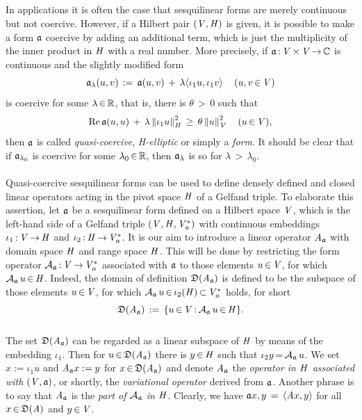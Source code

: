 \documentclass[11pt,twoside]{article}
\begin{document}
\subparagraph{} %
In applications it is often the case
that sesquilinear forms are merely continuous but not coercive.
However,
if a Hilbert pair $(\mathit{V},\mathit{H})$ is given,
it is possible to make a form $\mathfrak{a}$ coercive by adding an additional term,
which is just the multiplicity of the inner product in $\mathit{H}$
with a real number.
More precisely,
if $\mathfrak{a} {\,:\,} \mathit{V} {\,\times\,} \mathit{V} {\,\to\,} {\mathbb{C}}$ is continuous
and the slightly modified form
\[
\mathfrak{a}_{\lambda}(u,v) \,:=\,
\mathfrak{a}(u,v) \,+\, \lambda \langle \iota_1 u,\iota_1 v \rangle\, \quad
(u,v {\,\in\,} \mathit{V})
\]
is coercive for some $\lambda {\,\in\,} {\mathbb{R}}$,
that is,
there is $\theta {\,>\,} 0$ such that
\[
\operatorname{Re} \mathfrak{a}(u,u)  \,+\,
\lambda \left\lVert \iota_1u \right\rVert_{\mathit{H}}^2 \, \geq \, \theta \left\lVert u \right\rVert_{\mathit{V}}^2
\quad (u {\,\in\,} \mathit{V}),
\]
then $\mathfrak{a}$ is called
\textit{quasi-coercive},
\textit{H-elliptic}
or simply a \textit{\GARDING} \textit{form}.
It should be clear that
if $\mathfrak{a}_{\lambda_0}$ is coercive for some $\lambda_0 {\,\in\,} {\mathbb{R}}$,
then $\mathfrak{a}_{\lambda}$ is so for $\lambda {\,>\,} \lambda_0$.

\paragraph{} %
Quasi-coercive sesquilinear forms can be used
to define densely defined and closed linear operators
acting in the pivot space $\mathit{H}$ of a Gelfand triple.
To elaborate this assertion,
let $\mathfrak{a}$ be a sesquilinear form defined on a Hilbert space $\mathit{V}$,
which is the left-hand side of a Gelfand triple $(\mathit{V},\mathit{H},\mathit{V}_a^*)$
with continuous embeddings
$\iota_1 {\,:\,} \mathit{V} {\,\to\,} \mathit{H}$ and
$\iota_2 {\,:\,} \mathit{H} {\,\to\,} \mathit{V}_a^*$.
It is our aim to introduce a linear operator $\mathit{A}_{\mathfrak{a}}$
with domain space $\mathit{H}$ and range space $\mathit{H}$.
This will be done by restricting the form operator
${{\mathcal{A}}_{\mathfrak{a}}} {\,:\,} \mathit{V} {\,\to\,} \mathit{V}_a^*$ associated with $\mathfrak{a}$
to those elements $u {\,\in\,} \mathit{V}$,
for which ${{\mathcal{A}}_{\mathfrak{a}}} \, u {\,\in\,} \mathit{H}$.
Indeed,
the domain of definition $\mathfrak{D}(\mathit{A}_{\mathfrak{a}})$ is defined
to be the subspace of those elements $u {\,\in\,} \mathit{V}$,
for which ${{\mathcal{A}}_{\mathfrak{a}}} \, u {\,\in\,} \iota_2(\mathit{H}) {\,\subset\,} \mathit{V}_a^*$ holds,
for short
\[
\mathfrak{D}(\mathit{A}_{\mathfrak{a}}) \,:=\, \{ u {\,\in\,} \mathit{V} {\,:\,} {{\mathcal{A}}_{\mathfrak{a}}} \, u {\,\in\,} \mathit{H} \}.
\]

\subparagraph{} %
The set $\mathfrak{D}(\mathit{A}_{\mathfrak{a}})$ can be regarded as a linear subspace
of $\mathit{H}$ by means of the embedding $\iota_1$.
Then for $u {\,\in\,} \mathfrak{D}(\mathit{A}_{\mathfrak{a}})$ there is $y {\,\in\,} \mathit{H}$
such that $\iota_2 y {\,=\,} {{\mathcal{A}}_{\mathfrak{a}}} \, u$.
We set $x := \iota_1 u$ and $\mathit{A}_{\mathfrak{a}} x := y$
for $x {\,\in\,} \mathfrak{D}(\mathit{A}_{\mathfrak{a}})$
and denote $\mathit{A}_{\mathfrak{a}}$
the \textit{operator in $\mathit{H}$ associated with $(\mathit{V},\mathfrak{a})$},
or shortly,
the \textit{variational operator} derived from $\mathfrak{a}$.
Another phrase is to say that
$\mathit{A}_{\mathfrak{a}}$ is the \textit{part of ${{\mathcal{A}}_{\mathfrak{a}}}$ in $\mathit{H}$}.
Clearly,
we have $\mathfrak{a}{x,y} \,=\, \langle \mathit{A} x,y \rangle$
for all $x {\,\in\,} \mathfrak{D}(\mathit{A})$ and $y {\,\in\,} \mathit{V}$.
\end{document}

